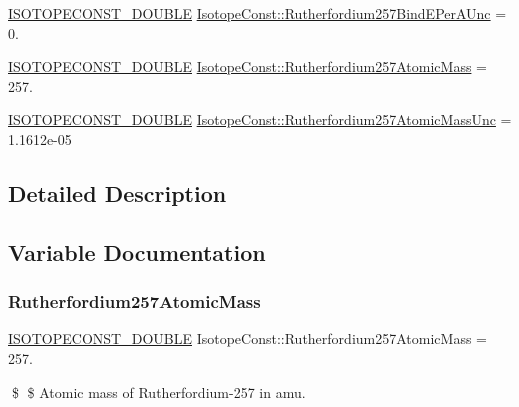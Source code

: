 \begin{DoxyCompactItemize}
\item 
\mbox{\hyperlink{group___isotope_const-_macros_ga8f45a7272ce02c0b4c65c44636ed719a}{I\+S\+O\+T\+O\+P\+E\+C\+O\+N\+S\+T\+\_\+\+D\+O\+U\+B\+LE}} \mbox{\hyperlink{group___isotope_const-_rutherfordium-_rf257_ga64cb0badd858c09c0920681189d11c95}{Isotope\+Const\+::\+Rutherfordium257\+Bind\+E\+Per\+A\+Unc}} = 0.
\item 
\mbox{\hyperlink{group___isotope_const-_macros_ga8f45a7272ce02c0b4c65c44636ed719a}{I\+S\+O\+T\+O\+P\+E\+C\+O\+N\+S\+T\+\_\+\+D\+O\+U\+B\+LE}} \mbox{\hyperlink{group___isotope_const-_rutherfordium-_rf257_ga162ca2ba7bbc8601e88d641a7de6710d}{Isotope\+Const\+::\+Rutherfordium257\+Atomic\+Mass}} = 257.
\item 
\mbox{\hyperlink{group___isotope_const-_macros_ga8f45a7272ce02c0b4c65c44636ed719a}{I\+S\+O\+T\+O\+P\+E\+C\+O\+N\+S\+T\+\_\+\+D\+O\+U\+B\+LE}} \mbox{\hyperlink{group___isotope_const-_rutherfordium-_rf257_ga8dedb6acd6ec62f84e8c95e66a9524fa}{Isotope\+Const\+::\+Rutherfordium257\+Atomic\+Mass\+Unc}} = 1.\+1612e-\/05
\end{DoxyCompactItemize}


\subsection{Detailed Description}


\subsection{Variable Documentation}
\mbox{\label{group___isotope_const-_rutherfordium-_rf257_ga162ca2ba7bbc8601e88d641a7de6710d}} 
\subsubsection{\texorpdfstring{Rutherfordium257\+Atomic\+Mass}{Rutherfordium257AtomicMass}}
{\footnotesize\ttfamily \mbox{\hyperlink{group___isotope_const-_macros_ga8f45a7272ce02c0b4c65c44636ed719a}{I\+S\+O\+T\+O\+P\+E\+C\+O\+N\+S\+T\+\_\+\+D\+O\+U\+B\+LE}} Isotope\+Const\+::\+Rutherfordium257\+Atomic\+Mass = 257.}

\$ \$ Atomic mass of Rutherfordium-\/257 in amu. \mbox{\label{group___isotope_const-_rutherfordium-_rf257_ga8dedb6acd6ec62f84e8c95e66a9524fa}} 
